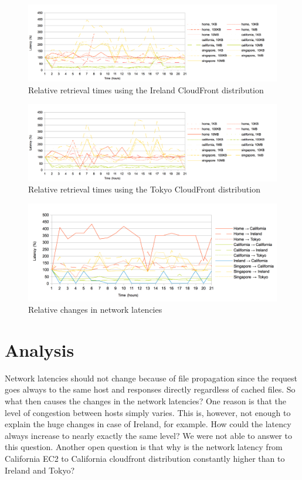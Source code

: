 \documentclass[conference]{IEEEtran}
\begin{document}
\begin{figure}[h]
    \centering
    \includegraphics[width=7in]{images/ireland_relative.png}
    \caption[]{Relative retrieval times using the Ireland CloudFront distribution}
    \label{fig:ireland_relative}
\end{figure}
\begin{figure}[h]
    \centering
    \includegraphics[width=7in]{images/tokyo_relative.png}
    \caption[]{Relative retrieval times using the Tokyo CloudFront distribution}
    \label{fig:tokyo_relative}
\end{figure}
\begin{figure}[h]
    \centering
    \includegraphics[width=7in]{images/pings_relative.png}
    \caption[]{Relative changes in network latencies}
    \label{fig:ping_relative}
\end{figure}

\section{Analysis}
Network latencies should not change because of file propagation since the request goes always to the same host and responses directly regardless of cached files. So what then causes the changes in the network latencies? One reason is that the level of congestion between hosts simply varies. This is, however, not enough to explain the huge changes in case of Ireland, for example. How could the latency always increase to nearly exactly the same level? We were not able to answer to this question. Another open question is that why is the network latency from California EC2 to California cloudfront distribution constantly higher than to Ireland and Tokyo?
\end{document}
